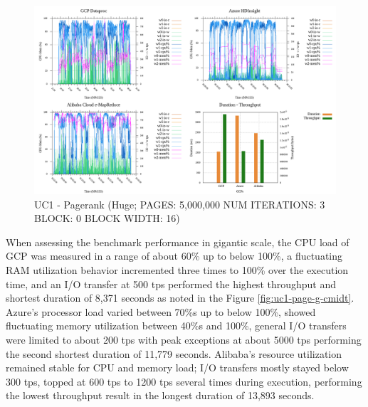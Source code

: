 \documentclass[review]{elsarticle}
\begin{document}
\begin{figure}[p]
	\caption{UC1 - Pagerank (Huge; PAGES: 5,000,000 NUM ITERATIONS: 3 BLOCK: 0 BLOCK WIDTH: 16)}
	\label{fig:uc1-page-h-cmidt}
	\includegraphics[width=\textwidth]{uc1-page-h-cmidt}
	\centering
\end{figure}

When assessing the benchmark performance in gigantic scale, the CPU load of GCP was measured in a range of about 60\% up to below 100\%, a fluctuating RAM utilization behavior incremented three times to 100\% over the execution time, and an I/O transfer at 500 tps performed the highest throughput and shortest duration of 8,371 seconds as noted in the Figure \ref{fig:uc1-page-g-cmidt}. Azure's processor load varied between 70\%s up to below 100\%, showed fluctuating memory utilization between 40\%s and 100\%, general I/O transfers were limited to about 200 tps with peak exceptions at about 5000 tps performing the second shortest duration of 11,779 seconds. Alibaba's resource utilization remained stable for CPU and memory load; I/O transfers mostly stayed below 300 tps, topped at 600 tps to 1200 tps several times during execution, performing the lowest throughput result in the longest duration of 13,893 seconds.
\end{document}
